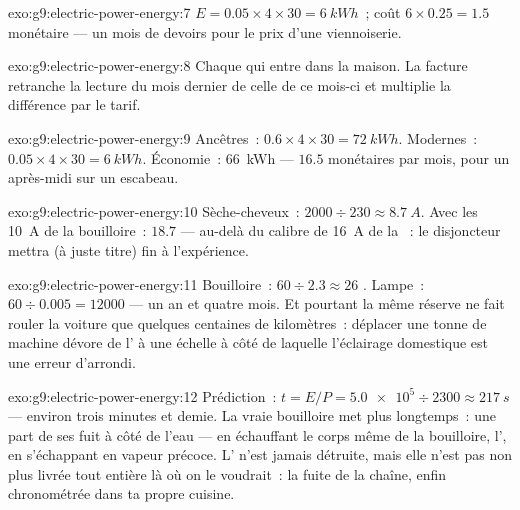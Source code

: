 \begin{solution}{exo:g9:electric-power-energy:7}
$E = 0.05 \times 4 \times 30 = \qty{6}{kWh}$~; coût
$6 \times 0.25 = 1.5$  monétaire --- un mois de devoirs pour le
prix d'une viennoiserie.
\end{solution}

\begin{solution}{exo:g9:electric-power-energy:8}
Chaque  qui entre dans la maison. La facture retranche la
lecture du mois dernier de celle de ce mois-ci et multiplie la
différence par le tarif.
\end{solution}

\begin{solution}{exo:g9:electric-power-energy:9}
Ancêtres~: $0.6 \times 4 \times 30 = \qty{72}{kWh}$. Modernes~:
$0.05 \times 4 \times 30 = \qty{6}{kWh}$. Économie~: \qty{66}{kWh}
--- $16.5$  monétaires par mois, pour un après-midi sur un
escabeau.
\end{solution}

\begin{solution}{exo:g9:electric-power-energy:10}
Sèche-cheveux~: $2000 \div 230 \approx \qty{8.7}{A}$. Avec les
\qty{10}{A} de la bouilloire~: $18.7$ --- au-delà du calibre de
\qty{16}{A} de la ~: le disjoncteur mettra (à juste titre) fin
à l'expérience.
\end{solution}

\begin{solution}{exo:g9:electric-power-energy:11}
Bouilloire~: $60 \div 2.3 \approx 26$ . Lampe~:
$60 \div 0.005 = 12000$  --- un an et quatre mois. Et pourtant
la même réserve ne fait rouler la voiture que quelques centaines de
kilomètres~: déplacer une tonne de machine dévore de l' à une
échelle à côté de laquelle l'éclairage domestique est une erreur
d'arrondi.
\end{solution}

\begin{solution}{exo:g9:electric-power-energy:12}
Prédiction~: $t = E/P = \num{5.0e5} \div 2300 \approx \qty{217}{s}$
--- environ trois minutes et demie. La vraie bouilloire met plus
longtemps~: une part de ses  fuit à côté de l'eau --- en
échauffant le corps même de la bouilloire, l', en s'échappant en
vapeur précoce. L' n'est jamais détruite, mais elle n'est pas
non plus livrée tout entière là où on le voudrait~: la fuite de la
chaîne, enfin chronométrée dans ta propre cuisine.
\end{solution}

